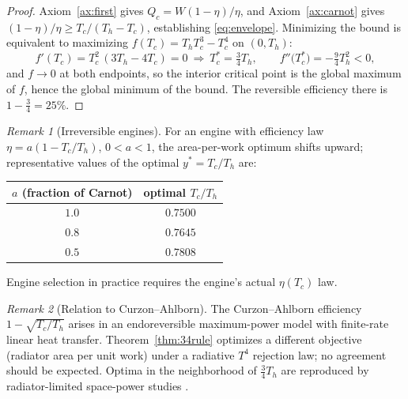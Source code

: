 \documentclass[11pt]{article}
\theoremstyle{definition}
\theoremstyle{remark}
\newtheorem{remark}{Remark}
\newcommand{\Th}{T_h}
\newcommand{\Tc}{T_c}
\begin{document}
\begin{proof}
Axiom~\ref{ax:first} gives $Q_{c}=W(1-\eta)/\eta$, and Axiom~\ref{ax:carnot} gives $(1-\eta)/\eta\ge\Tc/(\Th-\Tc)$, establishing \eqref{eq:envelope}. Minimizing the bound is equivalent to maximizing $f(\Tc)=\Th \Tc^{3}-\Tc^{4}$ on $(0,\Th)$:
\[
f'(\Tc)=\Tc^{2}\,(3\Th-4\Tc)=0\ \Rightarrow\ \Tc^{*}=\tfrac{3}{4}\Th,
\qquad
f''\bigl(\Tc^{*}\bigr)=-\tfrac{9}{4}\Th^{2}<0,
\]
and $f\to0$ at both endpoints, so the interior critical point is the global maximum of $f$, hence the global minimum of the bound. The reversible efficiency there is $1-\tfrac{3}{4}=25\%$.
\end{proof}

\begin{remark}[Irreversible engines]\label{rem:irr}
For an engine with efficiency law $\eta=a(1-\Tc/\Th)$, $0<a<1$, the area-per-work optimum shifts upward; representative values of the optimal $y^{*}=\Tc/\Th$ are:
\begin{center}
\begin{tabular}{cc}
\toprule
$a$ (fraction of Carnot) & optimal $\Tc/\Th$\\
\midrule
$1.0$ & $0.7500$\\
$0.8$ & $0.7645$\\
$0.5$ & $0.7808$\\
\bottomrule
\end{tabular}
\end{center}
Engine selection in practice requires the engine's actual $\eta(\Tc)$ law.
\end{remark}

\begin{remark}[Relation to Curzon--Ahlborn]
The Curzon--Ahlborn efficiency $1-\sqrt{\Tc/\Th}$ \cite{curzon1975} arises in an endoreversible maximum-power model with finite-rate linear heat transfer. Theorem~\ref{thm:34rule} optimizes a different objective (radiator area per unit work) under a radiative $T^{4}$ rejection law; no agreement should be expected. Optima in the neighborhood of $\tfrac{3}{4}\Th$ are reproduced by radiator-limited space-power studies \cite{nasa1989,energyreports2022}.
\end{remark}
\end{document}
